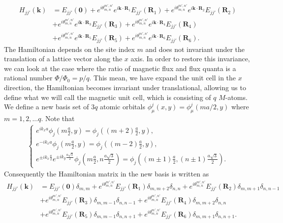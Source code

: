\documentclass{report}
\begin{document}
\begin{equation}
	\begin{aligned}
		H_{jj'}(\mathbf{k})
		 & = E_{jj'}(\mathbf{0}) + e^{i\theta_{m,n}^{m',n'} }e^{i \mathbf{k} \cdot \mathbf{R}_{1}} E_{jj'}(\mathbf{R}_{1}) + e^{i\theta_{m,n}^{m',n'} } e^{i \mathbf{k} \cdot \mathbf{R}_{2}} E_{jj'}(\mathbf{R}_{2}) \\
		 & + e^{i\theta_{m,n}^{m',n'} } e^{i \mathbf{k} \cdot \mathbf{R}_{3}} E_{jj'}(\mathbf{R}_{3}) + e^{i\theta_{m,n}^{m',n'} }e^{i \mathbf{k} \cdot \mathbf{R}_{4}} E_{jj'}(\mathbf{R}_{4})                       \\
		 & + e^{i\theta_{m,n}^{m',n'} } e^{i \mathbf{k} \cdot \mathbf{R}_{5}} E_{jj'}(\mathbf{R}_{5}) + e^{i\theta_{m,n}^{m',n'} }e^{i \mathbf{k} \cdot \mathbf{R}_{6}} E_{jj'}(\mathbf{R}_{6}).
	\end{aligned}
\end{equation}
The Hamiltonian depends on the site index $m$ and does not invariant under the translation of a lattice vector along the $x$ axis. In order to restore this invariance, we can look at the case where the ratio of magnetic flux and flux quanta is a rational number $\Phi / \Phi_{0} = p / q$. This mean, we have expand the unit cell in the $x$ direction, the Hamiltonian becomes invariant under translational, allowing us to define what we will call the magnetic unit cell, which is consisting of $q$ $M$-atoms. %
We define a new basis set of $3q$ atomic orbitals $\phi_{\mu}^{j} (x,y) = \phi_{\mu}^{j} (ma/2,y)$ where $m = 1,2,...q$. Note that
\begin{gather}
	\begin{cases}
		e^{i k_{x} a} \phi_{j} \left(m \frac{a}{2},y\right) = \phi_{j} \left((m+2)\frac{a}{2},y\right),  \\
		e^{-i k_{x} a} \phi_{j} \left(m\frac{a}{2},y\right) = \phi_{j} \left((m-2)\frac{a}{2},y\right) , \\
		e^{\pm i k_{x} \frac{a}{2}} e^{\pm i k_{y} \frac{a\sqrt{3}}{2}} \phi_{j} \left(m \frac{a}{2},n \frac{a\sqrt{3}}{2}\right) = \phi_{j} \left((m \pm 1)\frac{a}{2},(n \pm 1)\frac{a\sqrt{3}}{2}\right).
	\end{cases}
\end{gather}
Consequently the Hamiltonian matrix in the new basis is written as
\begin{equation}
	\begin{aligned}
		H_{jj'}(\mathbf{k})
		 & = E_{jj'}(\mathbf{0})\delta_{m,m} + e^{i\theta_{m,n}^{m',n'}} E_{jj'}(\mathbf{R}_{1}) \delta_{m,m+2}\delta_{n,n} + e^{i\theta_{m,n}^{m',n'}} E_{jj'}(\mathbf{R}_{2}) \delta_{m,m+1} \delta_{n,n - 1} \\
		 & + e^{i\theta_{m,n}^{m',n'}} E_{jj'}(\mathbf{R}_{3}) \delta_{m,m - 1} \delta_{n,n - 1} + e^{i\theta_{m,n}^{m',n'}} E_{jj'}(\mathbf{R}_{4}) \delta_{m,m + 2} \delta_{n,n}                              \\
		 & + e^{i\theta_{m,n}^{m',n'}} E_{jj'}(\mathbf{R}_{5}) \delta_{m,m - 1} \delta_{n,n + 1} + e^{i\theta_{m,n}^{m',n'}} E_{jj'}(\mathbf{R}_{6}) \delta_{m,m + 1} \delta_{n,n + 1}.
	\end{aligned}
\end{equation}
\end{document}

